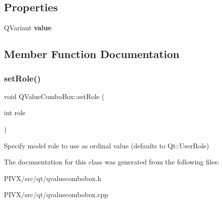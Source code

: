 \subsection*{Properties}
\begin{DoxyCompactItemize}
\item 
\mbox{\label{class_q_value_combo_box_ac487ee6027e1b8b7c211f95d60c45f7c}} 
Q\+Variant {\bfseries value}
\end{DoxyCompactItemize}


\subsection{Member Function Documentation}
\mbox{\label{class_q_value_combo_box_a9db5bc48951130e1104322de54f55471}} 
\subsubsection{\texorpdfstring{set\+Role()}{setRole()}}
{\footnotesize\ttfamily void Q\+Value\+Combo\+Box\+::set\+Role (\begin{DoxyParamCaption}\item[{int}]{role }\end{DoxyParamCaption})}

Specify model role to use as ordinal value (defaults to Qt\+::\+User\+Role) 

The documentation for this class was generated from the following files\+:\begin{DoxyCompactItemize}
\item 
P\+I\+V\+X/src/qt/qvaluecombobox.\+h\item 
P\+I\+V\+X/src/qt/qvaluecombobox.\+cpp\end{DoxyCompactItemize}
